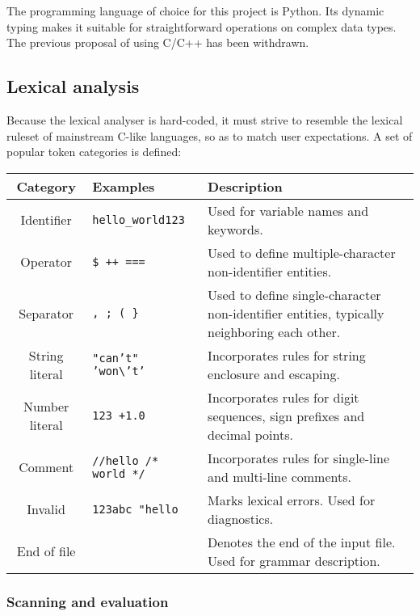\documentclass{article}
\begin{document}
	The programming language of choice for this project is Python. Its dynamic
	typing makes it suitable for straightforward operations on complex data
	types. The previous proposal of using C/C++ has been withdrawn.

	\subsection{Lexical analysis}

	Because the lexical analyser is hard-coded, it must strive to resemble the
	lexical ruleset of mainstream C-like languages, so as to match user
	expectations. A set of popular token categories is defined:

	\begin{center}
	\begin{tabular}{ |c|p{2.5cm}|p{6cm}| }
		\hline
			Category & Examples & Description \\
		\hline
			Identifier & \texttt{hello\_world123} & Used for variable names and keywords. \\
		\hline
			Operator & \texttt{\$ ++ ===} & Used to define multiple-character non-identifier entities. \\
		\hline
			Separator & \texttt{, ; ( \}} & Used to define single-character non-identifier entities, typically neighboring each other. \\
		\hline
			String literal & \texttt{"can't" 'won\textbackslash't'} & Incorporates rules for string enclosure and escaping. \\
		\hline
			Number literal & \texttt{123 +1.0} & Incorporates rules for digit sequences, sign prefixes and decimal points. \\
		\hline
			Comment & \texttt{//hello \newline /* world */} & Incorporates rules for single-line and multi-line comments. \\
		\hline
			Invalid & \texttt{123abc "hello} & Marks lexical errors. Used for diagnostics. \\
		\hline
			End of file & & Denotes the end of the input file. Used for grammar description. \\
		\hline
	\end{tabular}
	\end{center}

	\subsubsection{Scanning and evaluation}
\end{document}
